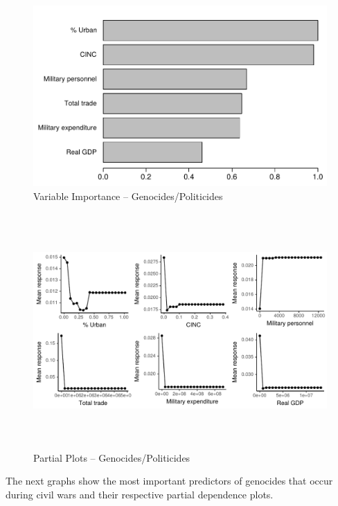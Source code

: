\begin{figure}[H]
    \centering
    \includegraphics{images/drf-gp.pdf}
    \caption{Variable Importance -- Genocides/Politicides}
    \label{fig:my_label}
\end{figure}

\begin{figure}[H]
    \centering
    \includegraphics[width=\textwidth, height=9cm]{images/drfdpp4a.pdf}
    \caption{Partial Plots -- Genocides/Politicides}
    \label{fig:my_label}
\end{figure}

\newpage

The next graphs show the most important predictors of genocides that occur during civil wars and their respective partial dependence plots. 

